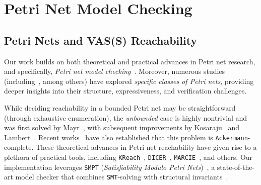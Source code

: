 \clearpage

\section{Petri Net Model Checking}
\label{appendix:smpt}


\subsection{Petri Nets and VAS(S) Reachability}
	
	Our work builds on both theoretical and practical advances in 
	Petri net research, and specifically, \textit{Petri net model checking}~\cite{Mu89,Es96,Re12,EsNi24,DuLaSr25,HuScReAb17,AmBeDo14,PiHaRe20,Wo18}.
	Moreover, numerous studies (including~\cite{LiWaChSuZh02,Zu91,AkChDaJaSa17,AnPePe13,AnBeCh16,EtChRo16,AnBeCh14}, among others) have explored \textit{specific classes of Petri nets}, providing deeper insights into their structure, expressiveness, and verification challenges.
	
	
	\medskip
	While deciding reachability in a bounded Petri net may be straightforward (through exhaustive enumeration), the \textit{unbounded} case is highly nontrivial and was first solved by 
	Mayr~\cite{Ma81}, with subsequent improvements by Kosaraju~\cite{Ko82} and 
	Lambert~\cite{La92}. Recent works~\cite{CzWo22,Le22} have also established that this 
	problem is \texttt{Ackermann}-complete.
	These theoretical advances in Petri net reachability have given rise to a 
	plethora of practical tools, including \texttt{KReach}~\cite{DiLa20}, 
	\texttt{DICER}~\cite{XiZhLi21}, \texttt{MARCIE}~\cite{HeRoSc13}, and others. 
	Our implementation leverages \texttt{SMPT} (\emph{Satisfiability Modulo Petri Nets})~\cite{AmDa23}, a state-of-the-art model checker that combines \texttt{SMT}-solving with structural invariants~\cite{AmBeDa21,amat2022polyhedral}.
	

